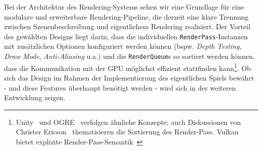Bei der Architektur des Rendering-Systems sehen wir eine Grundlage für eine modulare und erweiterbare Rendering-Pipeline, die derzeit eine klare Trennung zwischen Szenenbeschreibung und eigentlichem Rendering realisiert.
Der Vorteil des gewählten Designs liegt darin, dass die individuellen \texttt{RenderPass}-Instanzen mit zusätzlichen Optionen konfiguriert werden können (bspw. \textit{Depth Testing}, \textit{Draw Mode}, \textit{Anti-Aliasing} u.a.) und die \texttt{RenderQueue}s so sortiert werden können, dass die Kommunikation mit der GPU möglichst effizient stattfinden kann\footnote{
    Unity~\cite[]{UnityRenderQueue} und OGRE~\cite[]{OgreRenderQueue} verfolgen ähnliche Konzepte; auch Diskussionen von Christer Ericson~\cite[]{ChristerEricson} thematisieren die Sortierung des Render-Pass. Vulkan bietet explizite Render-Pass-Semantik~\cite[]{VulkanRenderPass}
}.
Ob sich das Design im Rahmen der Implementierung des eigentlichen Spiels bewährt - und diese Features überhaupt benötigt werden - wird sich in der weiteren Entwicklung zeigen.



